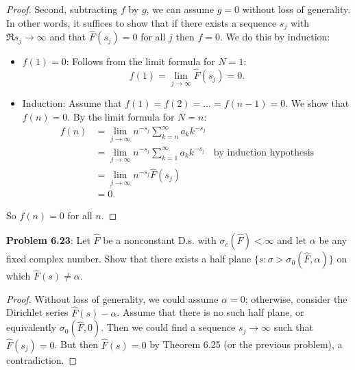 \documentclass[12pt]{article}
\newcommand{\Fhat}{\widehat{F}}
\begin{document}
\begin{proof}
Second, subtracting $f$ by $g$, we can assume $g = 0$ without loss of generality. In other words, it suffices to show that if there exists a sequence $s_j$ with $\Re s_j \rightarrow \infty$ and that $\Fhat(s_j) = 0$ for all $j$ then $f = 0$. We do this by induction:
\begin{itemize}
\item $f(1) = 0$: Follows from the limit formula for $N = 1$:
$$f(1) = \lim_{j \rightarrow \infty} \Fhat(s_j) = 0.$$
\item Induction: Assume that $f(1) = f(2) = ... = f(n - 1) = 0$. We show that $f(n) = 0$. By the limit formula for $N = n$:
\begin{align*}
f(n) &= \lim_{j \rightarrow \infty} n^{-s_j} \sum_{k = n}^{\infty} a_k k^{-s_j} \\
&= \lim_{j \rightarrow \infty} n^{-s_j} \sum_{k = 1}^{\infty} a_k k^{-s_j} &\text{by induction hypothesis}\\
&= \lim_{j \rightarrow \infty} n^{-s_j} \Fhat(s_j)\\
&= 0.
\end{align*}
\end{itemize}
So $f(n) = 0$ for all $n$.
\end{proof}

\textbf{Problem 6.23}: Let $\Fhat$ be a nonconstant D.s. with $\sigma_c(\Fhat) < \infty$ and let $\alpha$ be any fixed complex number. Show that there exists a half plane $\{s : \sigma > \sigma_0(\Fhat, \alpha) \}$ on which $\Fhat(s) \not= \alpha$.

\begin{proof}
Without loss of generality, we could assume $\alpha = 0$; otherwise, consider the Dirichlet series $\Fhat(s) - \alpha$. Assume that there is no such half plane, or equivalently $\sigma_0(\Fhat, 0)$. Then we could find a sequence $s_j \rightarrow \infty$ such that $\Fhat(s_j) = 0$. But then $\Fhat(s) = 0$ by Theorem 6.25 (or the previous problem), a contradiction.
\end{proof}

\unless\ifdefined\IsMainDocument
\end{document}
